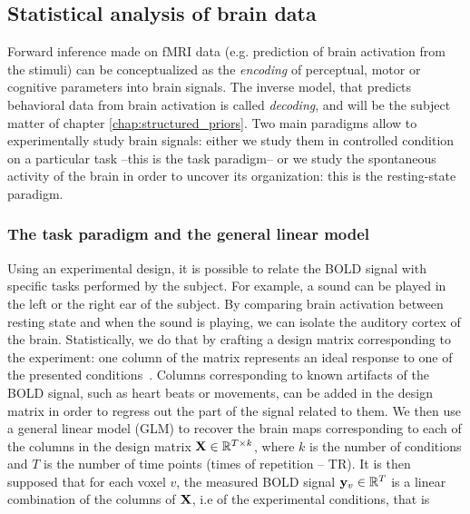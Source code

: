 \subsection{Statistical analysis of brain data}
\label{sec:glm}
Forward inference made on fMRI data (e.g. prediction of brain
activation from the stimuli) can be conceptualized as the \textit{encoding} of perceptual,
motor or cognitive parameters into brain signals. The inverse model, that
predicts behavioral data from brain activation is called \textit{decoding}, and will be the subject matter of chapter \ref{chap:structured_priors}. Two main paradigms allow to experimentally study brain
signals: either we study them in controlled condition on a particular task
--this is the task paradigm-- or we study the spontaneous activity of the brain in
order to uncover its organization: this is the resting-state paradigm.

\subsubsection{The task paradigm and the general linear model}
Using an experimental design, it is possible to relate the BOLD signal with
specific tasks performed by the subject. For example, a sound can be played in
the left or the right ear of the subject. By comparing brain activation between
resting state and when the sound is playing, we can isolate the auditory cortex
of the brain.
Statistically, we do that by crafting a design matrix corresponding to the
experiment: one column of the matrix represents an ideal response to one of the presented conditions~\citep{friston1994statistical}.
Columns corresponding to known artifacts of the BOLD signal, such as heart
beats or movements, can be added in the design matrix in order to regress out
the part of the signal related to them. We then use a general linear model (GLM) to
recover the brain maps corresponding to each of the columns in the design
matrix $\mathbf{X} \in \mathbb R^{T \times k}$, where $k$ is the number of conditions and $T$ is the number of time points (times of repetition -- TR).  It is then supposed that for each voxel $v$, the measured BOLD signal $\mathbf{y}_v \in \mathbb R^T$ is a linear combination of the columns of $\mathbf{X}$, i.e of the experimental conditions, that is

